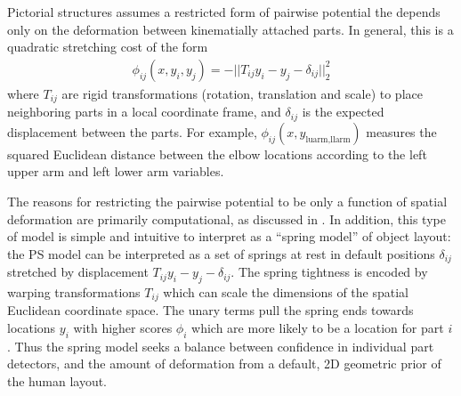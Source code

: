 Pictorial structures assumes a restricted form of 
pairwise potential the depends only on the deformation between kinematially 
attached parts. In general, this is a quadratic stretching cost of the form 
\begin{align} \label{eq:springcost}
\phi_{ij}(x,y_i,y_j) = -||T_{ij} y_i - y_j - \delta_{ij} ||_2^2 \end{align}
where $T_{ij}$ are rigid transformations (rotation, translation and scale) to 
place neighboring parts in a local coordinate frame, and $\delta_{ij}$ is the 
expected displacement between the parts.  For example, 
$\phi_{ij}(x,y_{\text{luarm,llarm}})$ measures the squared Euclidean distance 
between the elbow locations according to the left upper arm and left lower arm 
variables.  

 The reasons for restricting the pairwise 
potential to be only a function of spatial deformation are primarily 
computational, as discussed in .  In addition, this type 
of model is simple and intuitive to interpret as a ``spring model'' of object 
layout: the PS model can be interpreted as a set of springs at rest in default 
positions $\delta_{ij}$ stretched by displacement $T_{ij} y_i - y_j - 
\delta_{ij}$.  The spring tightness is encoded by warping transformations 
$T_{ij}$ which can scale the dimensions of the spatial Euclidean coordinate 
space.  The unary terms pull the spring ends towards locations $y_i$ with 
higher scores $\phi_i$ which are more likely to be a location for part $i$.  
Thus the spring model seeks a balance between confidence in individual part 
detectors, and the amount of deformation from a default, 2D geometric prior of 
the human layout.

